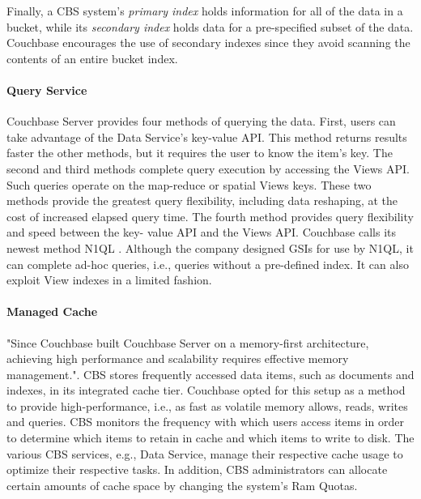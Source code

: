 \documentclass[9pt,twocolumn,twoside]{styles/osajnl}
\begin{document}
Finally, a CBS system's \textit{primary index} holds information for all of the data in a bucket, while its \textit{secondary index} holds data for a pre-specified subset of the data. Couchbase encourages the use of secondary indexes since they avoid scanning the contents of an entire bucket index.

\paragraph{Query Service} Couchbase Server provides four methods of querying the data.  First, users can take advantage of the Data Service's key-value API.  This method returns results faster the other methods, but it requires the user to know the item's key.  The second and third methods complete query execution by accessing the Views API.  Such queries operate on the map-reduce or spatial Views keys.  These two methods provide the greatest query flexibility, including data reshaping, at the cost of increased elapsed query time.  The fourth method provides query flexibility and speed between the key- value API and the Views API.  Couchbase calls its newest method N1QL \cite{www-viewsindexing-cbsinc}. Although the company designed GSIs for use by N1QL, it can complete ad-hoc queries, i.e., queries without a pre-defined index. It can also exploit View indexes in a limited fashion.

\paragraph{Managed Cache} "Since Couchbase built Couchbase Server on a
memory-first architecture, achieving high performance and scalability requires effective memory management."\cite{www-cachinglayer-cbsinc}.  CBS stores frequently accessed data items, such as documents and indexes, in its integrated cache tier.  Couchbase opted for this setup as a method to provide high-performance, i.e., as fast as volatile memory allows, reads, writes and queries.  CBS monitors the frequency with which users access items in order to determine which items to retain in cache and which items to write to disk.  The various CBS services, e.g., Data Service, manage their respective cache usage to optimize their respective tasks. In addition, CBS administrators can allocate certain amounts of cache space by changing the system's Ram Quotas.  \cite{www-cachinglayer-cbsinc}
\end{document}
